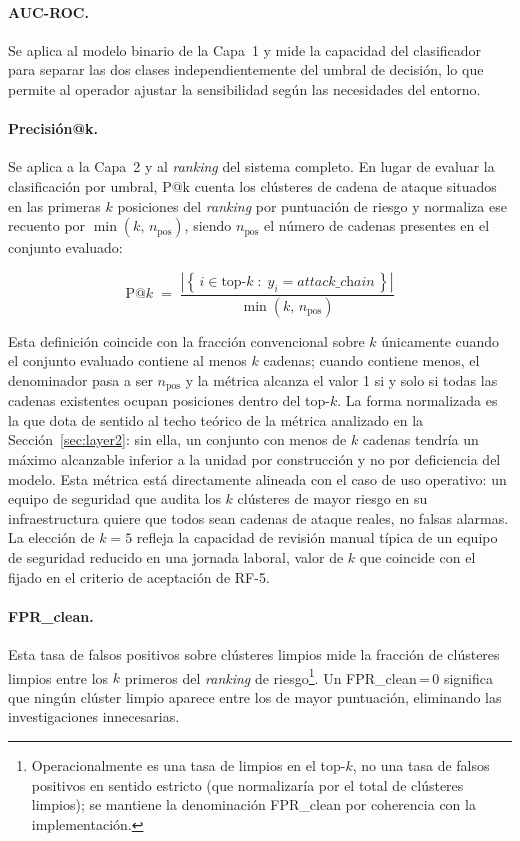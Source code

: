 \paragraph{\ac{AUC}-\acs{ROC}.} Se aplica al modelo binario de la Capa~1 y mide
la capacidad del clasificador para
separar las dos clases independientemente del umbral de decisión, lo que permite
al operador ajustar la sensibilidad según las necesidades del entorno.

\paragraph{Precisión@k.} Se aplica a la Capa~2 y al \textit{ranking} del sistema
completo. En lugar de evaluar la clasificación por umbral, P@k cuenta los
clústeres de cadena de ataque situados en las primeras \(k\) posiciones del
\textit{ranking} por puntuación de riesgo y normaliza ese recuento por
\(\min(k,\, n_{\text{pos}})\), siendo \(n_{\text{pos}}\) el número de cadenas
presentes en el conjunto evaluado:

\begin{equation}
  \text{P@}k \;=\;
  \frac{\left|\left\{\, i \in \text{top-}k \;:\; y_i = \textit{attack\_chain} \,\right\}\right|}
       {\min(k,\, n_{\text{pos}})}
  \label{eq:precision_at_k}
\end{equation}

Esta definición coincide con la fracción convencional sobre \(k\) únicamente
cuando el conjunto evaluado contiene al menos \(k\) cadenas; cuando contiene
menos, el denominador pasa a ser \(n_{\text{pos}}\) y la métrica alcanza el valor
1 si y solo si todas las cadenas existentes ocupan posiciones dentro del top-\(k\).
La forma normalizada es la que dota de sentido al techo teórico de la métrica
analizado en la Sección~\ref{sec:layer2}: sin ella, un conjunto con menos de
\(k\) cadenas tendría un máximo alcanzable inferior a la unidad por construcción
y no por deficiencia del modelo. Esta métrica está directamente
alineada con el caso de uso operativo: un equipo de seguridad que audita los
\(k\) clústeres de mayor riesgo en su infraestructura quiere que todos sean cadenas
de ataque reales, no falsas alarmas. La elección de \(k=5\) refleja la capacidad
de revisión manual típica de un equipo de seguridad reducido en una jornada
laboral, valor de \(k\) que coincide con el fijado en el criterio de aceptación
de RF-5.

\paragraph{\ac{FPR}\_clean.} Esta tasa de falsos positivos sobre clústeres
limpios mide la fracción de clústeres limpios entre los \(k\) primeros del \textit{ranking} de
riesgo\footnote{Operacionalmente es una tasa de limpios en el top-\(k\), no una
tasa de falsos positivos en sentido estricto (que normalizaría por el total de
clústeres limpios); se mantiene la denominación \ac{FPR}\_clean por coherencia con
la implementación.}.
Un \ac{FPR}\_clean\,=\,0 significa que ningún clúster limpio aparece entre los de mayor
puntuación, eliminando las investigaciones innecesarias.
